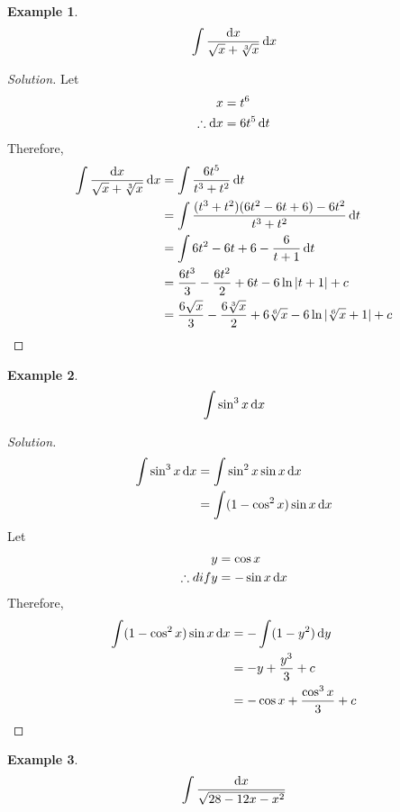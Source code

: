 \documentclass[fleqn, 12pt]{article}
\theoremstyle{definition}
\newtheorem{example}{Example}
\theoremstyle{theorem}
\newenvironment{solution}
{\begin{proof}[Solution]\let\qed\relax}
	{\end{proof}}
\begin{document}
\begin{example}
	\begin{equation*}
		\int \dfrac{\dif x}{\sqrt{x} + \sqrt[3]{x}} \dif x
	\end{equation*}
\end{example}

\begin{solution}
	Let
	\begin{align*}
		x &= t^6\\
		\therefore \dif x &= 6 t^5 \dif t
	\end{align*}
	Therefore,
	\begin{align*}
		\int \dfrac{\dif x}{\sqrt{x} + \sqrt[3]{x}} \dif x &= \int \dfrac{6 t^5}{t^3 + t^2} \dif t\\
		&= \int \dfrac{(t^3 + t^2)(6t^2 - 6t + 6) - 6t^2}{t^3 + t^2} \dif t\\
		&= \int 6t^2 - 6t + 6 - \dfrac{6}{t + 1} \dif t\\
		&= \dfrac{6t^3}{3} - \dfrac{6t^2}{2} + 6t - 6 \ln |t + 1| + c\\
		&= \dfrac{6\sqrt{x}}{3} - \dfrac{6\sqrt[3]{x}}{2} + 6\sqrt[6]{x} - 6 \ln |\sqrt[6]{x} + 1| + c
	\end{align*}
\end{solution}

\begin{example}
	\begin{equation*}
		\int \sin^3 x \dif x
	\end{equation*}
\end{example}

\begin{solution}
	\begin{align*}
		\int \sin^3 x \dif x &= \int \sin^2 x \sin x \dif x\\
		&= \int (1 - \cos^2 x) \sin x \dif x
	\end{align*}
	Let
	\begin{align*}
		y &= \cos x\\
		\therefore dif y &= - \sin x \dif x
	\end{align*}
	Therefore,
	\begin{align*}
		\int (1 - \cos^2 x) \sin x \dif x &= -\int (1 - y^2) \dif y\\
		&= -y + \dfrac{y^3}{3} + c\\
		&= - \cos x + \dfrac{\cos^3 x}{3} + c
	\end{align*}
\end{solution}

\begin{example}
	\begin{equation*}
		\int \dfrac{\dif x}{\sqrt{28 - 12x - x^2}}
	\end{equation*}
\end{example}
\end{document}
